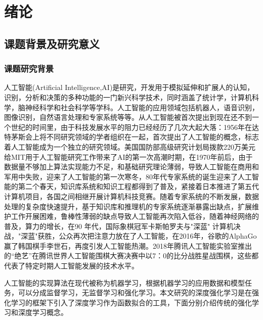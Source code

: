 \chapter{绪论}
\section{课题背景及研究意义}
\subsection{课题研究背景}
人工智能(Artificial Intelligence,AI)是研究，开发用于模拟延伸和扩展人的认知，识别，分析和决策的多种功能的一门新兴科学技术，同时涵盖了统计学，计算机科学，脑神经科学和社会科学等学科。人工智能的应用领域包括机器人，语音识别，图像识别，自然语言处理和专家系统等等。从人工智能被首次提出到现在还不到一个世纪的时间里，由于科技发展水平的阻力已经经历了几次大起大落：1956年在达特茅斯会上将不同研究领域的学者组织在一起，首次提出了人工智能的概念，标志着人工智能成为一个独立的研究领域。美国国防部高级研究计划局拨款220万美元给MIT用于人工智能研究工作带来了AI的第一次高潮时期，在1970年前后，由于数据量不够加上算法实现能力不足，和基础研究理论薄弱，导致人工智能在商用和军用中失败，迎来了人工智能的第一次寒冬，80年代专家系统的诞生迎来了人工智能的第二个春天，知识库系统和知识工程都得到了普及，紧接着日本推进了第五代计算机项目，各国之间相继开展计算机科技竞赛。随着专家系统的不断发展，数据处理的复杂度快速提升，基于知识库和推理机的专家系统逐渐暴露出缺点，扩展维护工作开展困难，鲁棒性薄弱的缺点导致人工智能再次陷入低谷，随着神经网络的普及，算力的增长，在90 年代，国际象棋冠军卡斯帕罗夫与"深蓝" 计算机决战，"深蓝"获胜，公众再次把注意力放在了人工智能，在2016年，谷歌的AlphaGo赢了韩国棋手李世石，再度引发人工智能热潮。2018年腾讯人工智能实验室推出的“绝艺”在腾讯世界人工智能围棋大赛决赛中以7：0的比分战胜星战围棋\cite{人工智能产业形势分析课题组20182018}，这些都代表了特定时期人工智能发展的技术水平。

人工智能的实现算法在现代被称为机器学习，根据机器学习的应用数据和模型任务，可以分成监督学习，无监督学习和强化学习。本文研究的深度强化学习是在强化学习的框架下引入了深度学习作为函数拟合的工具，下面分别介绍传统的强化学习和深度学习概念。

